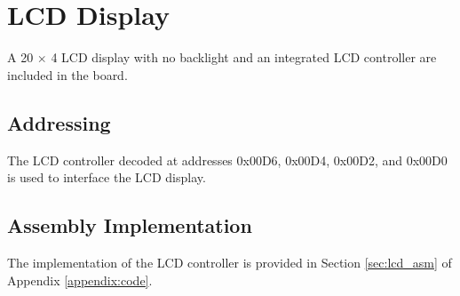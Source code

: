 \section{LCD Display}
A 20 $\times$ 4 LCD display with no backlight and an integrated LCD controller are included in the board.

    \subsection{Addressing}
    The LCD controller decoded at addresses 0x00D6, 0x00D4, 0x00D2, and 0x00D0 is used to interface the LCD display.

    \subsection{Assembly Implementation}
    The implementation of the LCD controller is provided in Section \ref{sec:lcd_asm} of Appendix \ref{appendix:code}.
